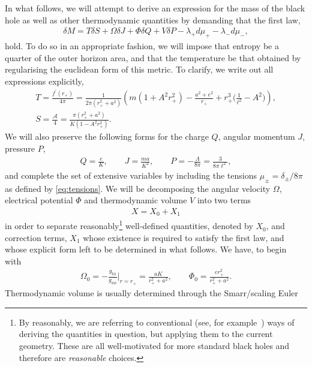\documentclass[
twoside,
openright,
frontopenright
]{dmathesis}
\newcommand{\nn}{\nonumber}
\begin{document}
In what follows, we will attempt to derive an expression for the mass of the
black hole as well as other thermodynamic quantities by demanding that the first
law,
\begin{align}
  \label{eq:fullFLT}
  \delta M = T\delta S + \Omega \delta J + \Phi \delta Q + V \delta P  - \lambda_+
  d\mu_+ - \lambda_- d\mu_-,
\end{align}
hold. To do so in an appropriate fashion, we will impose that entropy be a quarter of
the outer horizon area, and that the temperature be that obtained by
regularising the euclidean form of this metric. To clarify, we write out all
expressions explicitly, 
\begin{gather}
  T= \frac{f^\prime (r_+)}{4\pi} = \frac{1}{2\pi(r_+^2+a^2)}\left(m(1+A^2r_+^2)
    - \frac{a^2+e^2}{r_+}+r_+^3\Big(\frac{1}{\ell^2}-A^2\Big)\right), \nn\\ 
  S = \frac{\mathcal{A}}{4} = \frac{\pi(r_+^2+a^2)}{K(1-A^2 r_+^2)}.
  \label{eq:TS}
\end{gather}
We will also preserve the following forms for the charge $Q$, angular momentum
$J$, pressure $P$,
\begin{gather}
  \label{eq:QJP} Q=\frac{e}{K}, \qquad J = \frac{m a}{K^2}, \qquad P =
  -\frac{\Lambda}{8\pi} = \frac{3}{8\pi \ell^2},
\end{gather}
and complete the set of extensive variables by including the tensions
$\mu_\pm=\delta_\pm/8\pi$ as defined by \cref{eq:tensions}. We will be
decomposing the angular velocity $\Omega$, electrical potential $\Phi$ and
thermodynamic volume $V$ into two terms
\begin{align}
  \label{eq:X}
  X=X_0+X_1 
\end{align}
in order to separate reasonably\footnote{By reasonably, we are referring to
  conventional (see, for example~\cite{Gibbons:2004ai}) ways of deriving the
  quantities in question, but applying them to the current geometry. These are
  all well-motivated for more standard black holes and therefore are
  \emph{reasonable} choices.} well-defined quantities, denoted by $X_0$, and
correction terms, $X_1$ whose existence is required to satisfy the first law,
and whose explicit form left to be determined in what follows. We have, to
begin with~\cite{Caldarelli:1999xj}
\begin{gather}\label{eq:OP0}
\Omega_0 = -\frac{g_{t\phi}}{g_{\phi\phi}}\bigg|_{r=r_+} = \frac{a
  K}{r_+^2+a^2}, \qquad \Phi_0 = \frac{e r_+^2}{r_+^2+a^2}. 
\end{gather}
Thermodynamic volume is usually determined through the Smarr/scaling Euler
\end{document}
